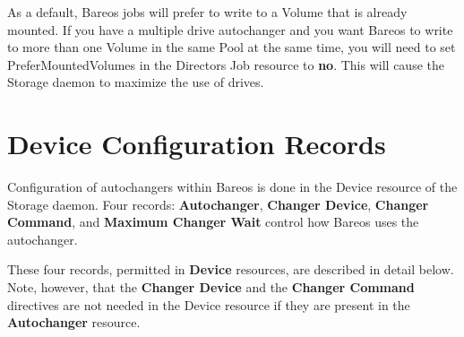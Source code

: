 As a default, Bareos jobs will prefer to write to a Volume that is
already mounted. If you have a multiple drive autochanger and you want
Bareos to write to more than one Volume in the same Pool at the same
time, you will need to set  {PreferMountedVolumes}
in the Directors Job resource to {\bf no}. This will cause
the Storage daemon to maximize the use of drives.


\label{ConfigRecords}
\section{Device Configuration Records}

Configuration of autochangers within Bareos is done in the Device resource of
the Storage daemon. Four records: {\bf Autochanger}, {\bf Changer Device},
{\bf Changer Command}, and {\bf Maximum Changer Wait} control how Bareos uses
the autochanger.

These four records, permitted in {\bf Device} resources, are described in
detail below. Note, however, that the {\bf Changer Device} and the
{\bf Changer Command} directives are not needed in the Device resource
if they are present in the {\bf Autochanger} resource.

